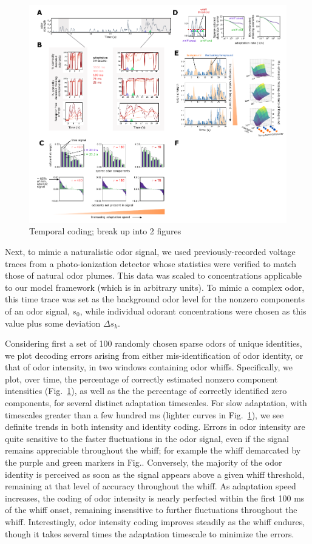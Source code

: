 \begin{figure}
	\includegraphics[width=\textwidth]{figures/Figures_temporal_coding}
	\caption{Temporal coding; {\color{blue} break up into 2 figures}}
	\label{fig:temporal_coding}
\end{figure}

Next, to mimic a naturalistic odor signal, we used previously-recorded voltage traces from a photo-ionization detector whose statistics were verified to match those of natural odor plumes. This data was scaled to concentrations applicable to our model framework (which is in arbitrary units). To mimic a complex odor, this time trace was set as the background odor level for the nonzero components of an odor signal, $s_0$, while individual odorant concentrations were chosen as this value plus some deviation $\Delta s_k$. 

Considering first a set of 100 randomly chosen sparse odors of unique identities, we plot decoding errors arising from either mis-identification of odor identity, or that of odor intensity, in two windows containing odor whiffs. Specifically, we plot, over time, the percentage of correctly estimated nonzero component intensities (Fig.~\ref{fig:temporal_coding}), as well as the the percentage of correctly identified zero components, for several distinct adaptation timescales. For slow adaptation, with timescales greater than a few hundred ms (lighter curves in Fig.~\ref{fig:temporal_coding}), we see definite trends in both intensity and identity coding. Errors in odor intensity are quite sensitive to the faster fluctuations in the odor signal, even if the signal remains appreciable throughout the whiff; for example the whiff demarcated by the purple and green markers in Fig.. Conversely, the majority of the odor identity is perceived as soon as the signal appears above a given whiff threshold, remaining at that level of accuracy throughout the whiff. As adaptation speed increases, the coding of odor intensity is nearly perfected within the first 100 ms of the whiff onset, remaining insensitive to further fluctuations throughout the whiff. Interestingly, odor intensity coding improves steadily as the whiff endures, though it takes several times the adaptation timescale to minimize the errors. 

